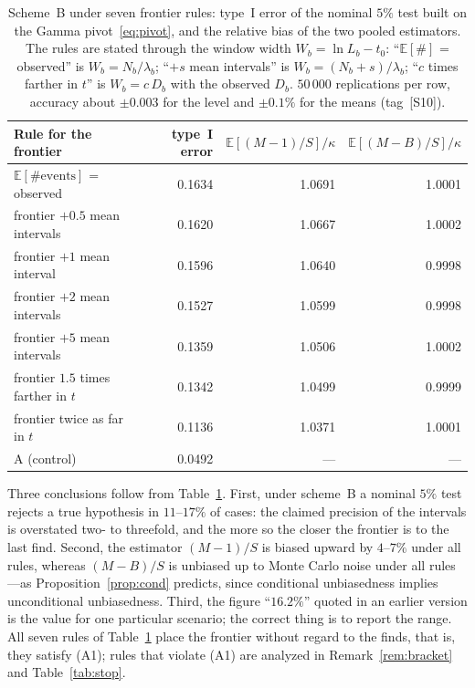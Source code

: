 \documentclass[11pt,a4paper]{article}
\theoremstyle{plain}
\theoremstyle{remark}
\begin{document}
\begin{table}[t]
\centering
\caption{Scheme~B under seven frontier rules: type~I error of the nominal $5\%$
test built on the Gamma pivot~\eqref{eq:pivot}, and the relative bias of the two
pooled estimators. The rules are stated through the window width
$W_b=\ln L_b-t_0$: ``$\mathbb E[\#]$ = observed'' is $W_b=N_b/\lambda_b$;
``$+s$ mean intervals'' is $W_b=(N_b+s)/\lambda_b$; ``$c$ times farther in $t$''
is $W_b=c\,D_b$ with the observed $D_b$. $50\,000$ replications per row, accuracy
about $\pm0.003$ for the level and $\pm0.1\%$ for the means (tag~[S10]).}
\label{tab:calib}
\small
\begin{tabular}{lrrr}
\toprule
Rule for the frontier & type~I error & $\mathbb E[(M{-}1)/S]/\kappa$
& $\mathbb E[(M{-}B)/S]/\kappa$\\
\midrule
$\mathbb E[\#\text{events}]$ = observed & 0.1634 & 1.0691 & 1.0001\\
frontier $+0.5$ mean intervals & 0.1620 & 1.0667 & 1.0002\\
frontier $+1$ mean interval & 0.1596 & 1.0640 & 0.9998\\
frontier $+2$ mean intervals & 0.1527 & 1.0599 & 0.9998\\
frontier $+5$ mean intervals & 0.1359 & 1.0506 & 1.0002\\
frontier $1.5$ times farther in $t$ & 0.1342 & 1.0499 & 0.9999\\
frontier twice as far in $t$ & 0.1136 & 1.0371 & 1.0001\\
\midrule
A (control) & 0.0492 & --- & ---\\
\bottomrule
\end{tabular}
\end{table}

Three conclusions follow from Table~\ref{tab:calib}. First, under scheme~B a
nominal $5\%$ test rejects a true hypothesis in $11$--$17\%$ of cases: the
claimed precision of the intervals is overstated two- to threefold, and the more
so the closer the frontier is to the last find. Second, the estimator $(M-1)/S$
is biased upward by $4$--$7\%$ under all rules, whereas $(M-B)/S$ is unbiased
up to Monte Carlo noise under all rules---as Proposition~\ref{prop:cond}
predicts, since conditional unbiasedness implies unconditional unbiasedness.
Third, the figure ``$16.2\%$'' quoted in an earlier version is the value for one
particular scenario; the correct thing is to report the range. All seven rules
of Table~\ref{tab:calib} place the frontier without regard to the finds, that
is, they satisfy (A1); rules that violate (A1) are analyzed in
Remark~\ref{rem:bracket} and Table~\ref{tab:stop}.
\end{document}
